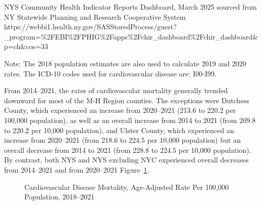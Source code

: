 \documentclass[
  english,
  letterpaper,
]{report}
\begin{document}
\begin{tcolorbox}[enhanced jigsaw, breakable, leftrule=.75mm, title=\textcolor{quarto-callout-note-color}{\faInfo}\hspace{0.5em}{Source}, bottomrule=.15mm, opacityback=0, left=2mm, colback=white, bottomtitle=1mm, coltitle=black, colbacktitle=quarto-callout-note-color!10!white, colframe=quarto-callout-note-color-frame, opacitybacktitle=0.6, toptitle=1mm, titlerule=0mm, arc=.35mm, rightrule=.15mm, toprule=.15mm]

NYS Community Health Indicator Reports Dashboard, March 2025 sourced
from NY Statewide Planning and Research Cooperative System
https://webbi1.health.ny.gov/SASStoredProcess/guest?\_program=\%2FEBI\%2FPHIG\%2Fapps\%2Fchir\_dashboard\%2Fchir\_dashboard\&p=ch\&cos=33

\end{tcolorbox}

\begin{tcolorbox}[enhanced jigsaw, breakable, leftrule=.75mm, title=\textcolor{quarto-callout-note-color}{\faInfo}\hspace{0.5em}{Note}, bottomrule=.15mm, opacityback=0, left=2mm, colback=white, bottomtitle=1mm, coltitle=black, colbacktitle=quarto-callout-note-color!10!white, colframe=quarto-callout-note-color-frame, opacitybacktitle=0.6, toptitle=1mm, titlerule=0mm, arc=.35mm, rightrule=.15mm, toprule=.15mm]

Note: The 2018 population estimates are also used to calculate 2019 and
2020 rates. The ICD-10 codes used for cardiovascular disease are:
I00-I99.

\end{tcolorbox}

From 2014--2021, the rates of cardiovascular mortality generally trended
downward for most of the M-H Region counties. The exceptions were
Dutchess County, which experienced an increase from 2020--2021 (213.6 to
220.2 per 100,000 population), as well as an overall increase from 2014
to 2021 (from 209.8 to 220.2 per 10,000 population), and Ulster County,
which experienced an increase from 2020--2021 (from 218.6 to 224.5 per
10,000 population) but an overall decrease from 2014 to 2021 (from 228.8
to 224.5 per 10,000 population). By contrast, both NYS and NYS excluding
NYC experienced overall decreases from 2014--2021 and from 2020--2021
Figure~\ref{fig-cardiovasdz-mortal-aar}.

\begin{figure}


\caption{\label{fig-cardiovasdz-mortal-aar}Cardiovascular Disease
Mortality, Age-Adjusted Rate Per 100,000 Population, 2018--2021}

\end{figure}%
\end{document}
